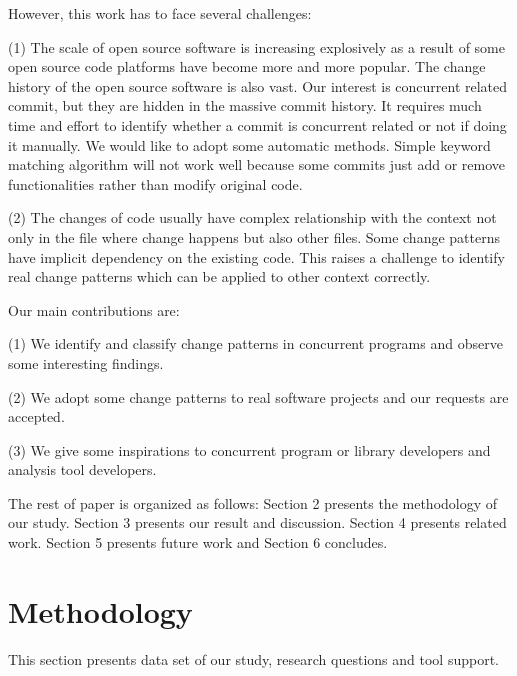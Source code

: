 \documentclass[conference]{IEEEtran}
\begin{document}
However, this work has to face several challenges:

(1) The scale of open source software is increasing explosively as a result of some open source code platforms have become more and more popular. The change history of the open source software is also vast. Our interest is concurrent related commit, but they are hidden in the massive commit history. It requires much time and effort to identify whether a commit is concurrent related or not if doing it manually. We would like to adopt some automatic methods. Simple keyword matching algorithm will not work well because some commits just add or remove functionalities rather than modify original code.

(2) The changes of code usually have complex relationship with the context not only in the file where change happens but also other files. Some change patterns have implicit dependency on the existing code. This raises a challenge to identify real change patterns which can be applied to other context correctly.

Our main contributions are:

(1) We identify and classify change patterns in concurrent programs and observe some interesting findings.

(2) We adopt some change patterns to real software projects and our requests are accepted.

(3) We give some inspirations to concurrent program or library developers and analysis tool developers.

The rest of paper is organized as follows: Section 2 presents the methodology of our study. Section 3 presents our result and discussion. Section 4 presents related work. Section 5 presents future work and Section 6 concludes.

\section{Methodology}
This section presents data set of our study, research questions and tool support.
\end{document}
